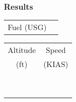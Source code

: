 % 
% 
%
\Large
\subsubsection*{Results}
  \begin{tabular}{p{2 cm}|p{2 cm}|}
  \cline{2-2}
  Fuel (USG)&\\
  \cline{2-2}
  \end{tabular}
  \vspace{0.2 in}
  
  \begin{tabular}{|p{2 cm}|p{2 cm}|}
  \hline
   \multicolumn{1}{|c|}{Altitude}&\multicolumn{1}{c|}{Speed}\\
   \multicolumn{1}{|c|}{(ft)}&\multicolumn{1}{c|}{(KIAS)}\\
   \hline
   \hline
   &\\
   \hline
   &\\
   \hline
   &\\
   \hline
   &\\
   \hline
   &\\
   \hline
   &\\
   \hline
   &\\
   \hline
   &\\
   \hline
   &\\
   \hline
   \end{tabular}  
   \normalsize
  
  
